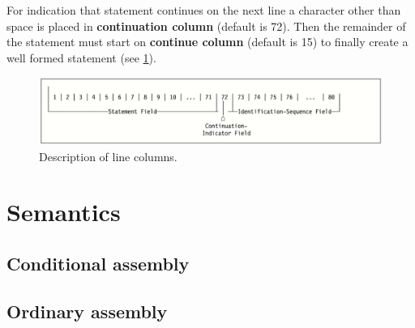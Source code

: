 For indication that statement continues on the next line a character other than space is placed in \textbf{continuation column} (default is 72). Then the remainder of the statement must start on \textbf{continue column} (default is 15) to finally create a well formed statement (see \cref{fig01:line}).

\begin{figure}\centering
	\includegraphics[width=\linewidth]{img/line}
	\caption{Description of line columns.}
	\label{fig01:line}
\end{figure}


\section{Semantics}

\subsection{Conditional assembly}

\subsection{Ordinary assembly}
